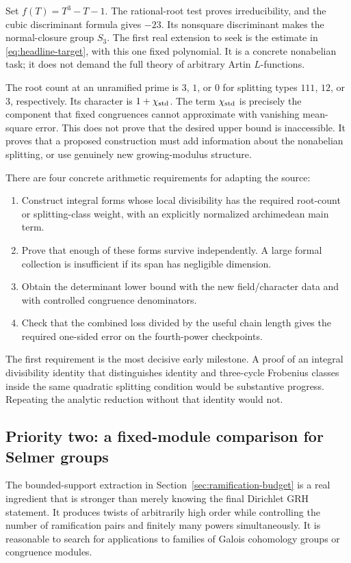 \documentclass[11pt,letterpaper]{article}
\theoremstyle{definition}
\theoremstyle{remark}
\begin{document}
Set $f(T)=T^3-T-1$. The rational-root test proves irreducibility, and
the cubic discriminant formula gives $-23$. Its nonsquare discriminant
makes the normal-closure group $S_3$. The first real extension to seek is
the estimate in \eqref{eq:headline-target}, with this one fixed polynomial.
It is a concrete nonabelian task; it does not demand the full theory of
arbitrary Artin $L$-functions.

The root count at an unramified prime is $3$, $1$, or $0$ for splitting
types $111$, $12$, or $3$, respectively. Its character is
$1+\chi_{\rm std}$. The term $\chi_{\rm std}$ is precisely the component
that fixed congruences cannot approximate with vanishing mean-square
error. This does not prove that the desired upper bound is inaccessible.
It proves that a proposed construction must add information about the
nonabelian splitting, or use genuinely new growing-modulus structure.

There are four concrete arithmetic requirements for adapting the source:
\begin{enumerate}
\item Construct integral forms whose local divisibility has the required
root-count or splitting-class weight, with an explicitly normalized
archimedean main term.
\item Prove that enough of these forms survive independently. A large
formal collection is insufficient if its span has negligible dimension.
\item Obtain the determinant lower bound with the new field/character
data and with controlled congruence denominators.
\item Check that the combined loss divided by the useful chain length
gives the required one-sided error on the fourth-power checkpoints.
\end{enumerate}

The first requirement is the most decisive early milestone. A proof
of an integral divisibility identity that distinguishes identity and
three-cycle Frobenius classes inside the same quadratic splitting
condition would be substantive progress. Repeating the analytic
reduction without that identity would not.

\subsection{Priority two: a fixed-module comparison for Selmer groups}

The bounded-support extraction in Section~\ref{sec:ramification-budget}
is a real ingredient that is stronger than merely knowing the final
Dirichlet GRH statement. It produces twists of arbitrarily high order
while controlling the number of ramification pairs and finitely many
powers simultaneously. It is reasonable to search for applications to
families of Galois cohomology groups or congruence modules.
\end{document}
